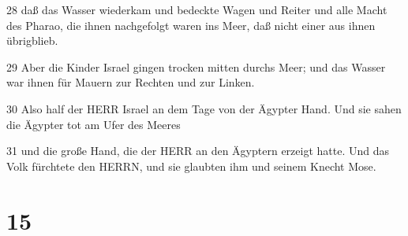 \par 28 daß das Wasser wiederkam und bedeckte Wagen und Reiter und alle Macht des Pharao, die ihnen nachgefolgt waren ins Meer, daß nicht einer aus ihnen übrigblieb.
\par 29 Aber die Kinder Israel gingen trocken mitten durchs Meer; und das Wasser war ihnen für Mauern zur Rechten und zur Linken.
\par 30 Also half der HERR Israel an dem Tage von der Ägypter Hand. Und sie sahen die Ägypter tot am Ufer des Meeres
\par 31 und die große Hand, die der HERR an den Ägyptern erzeigt hatte. Und das Volk fürchtete den HERRN, und sie glaubten ihm und seinem Knecht Mose.

\chapter{15}

